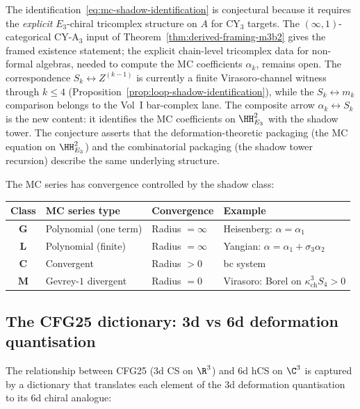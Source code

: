 \begin{remark}
\label{rem:mc-shadow-why-conjecture}
The identification~\eqref{eq:mc-shadow-identification} is conjectural because it requires the \emph{explicit} $E_3$-chiral tricomplex structure on $A$ for CY$_3$ targets. The \((\infty,1)\)-categorical CY-A$_3$ input of Theorem~\ref{thm:derived-framing-m3b2} gives the framed existence statement; the explicit chain-level tricomplex data for non-formal algebras, needed to compute the MC coefficients $\alpha_k$, remains open. The correspondence $S_k \leftrightarrow Z^{(k-1)}$ is currently a finite Virasoro-channel witness through $k\leq4$ (Proposition~\ref{prop:loop-shadow-identification}), while the $S_k \leftrightarrow m_k$ comparison belongs to the Vol~I bar-complex lane. The composite arrow $\alpha_k \leftrightarrow S_k$ is the new content: it identifies the MC coefficients on $\HH^2_{E_3}$ with the shadow tower. The conjecture asserts that the deformation-theoretic packaging (the MC equation on $\HH^2_{E_3}$) and the combinatorial packaging (the shadow tower recursion) describe the same underlying structure.
\end{remark}

The MC series has convergence controlled by the shadow class:
\begin{center}
\small
\renewcommand{\arraystretch}{1.15}
\begin{tabular}{clll}
\toprule
\textbf{Class} & \textbf{MC series type} & \textbf{Convergence} & \textbf{Example} \\
\midrule
$\mathbf{G}$ & Polynomial (one term) & Radius $= \infty$ & Heisenberg: $\alpha = \alpha_1$ \\
$\mathbf{L}$ & Polynomial (finite) & Radius $= \infty$ & Yangian: $\alpha = \alpha_1 + \sigma_3 \alpha_2$ \\
$\mathbf{C}$ & Convergent & Radius $> 0$ & bc system \\
$\mathbf{M}$ & Gevrey-$1$ divergent & Radius $= 0$ & Virasoro: Borel on $\kappa_{\mathrm{ch}}^3S_4>0$ \\
\bottomrule
\end{tabular}
\end{center}

\subsection{The CFG25 dictionary: 3d vs 6d deformation quantisation}
\label{subsec:cfg25-dictionary}

The relationship between CFG25 (3d CS on $\R^3$) and 6d hCS on $\C^3$ is captured by a dictionary that translates each element of the 3d deformation quantisation to its 6d chiral analogue:

